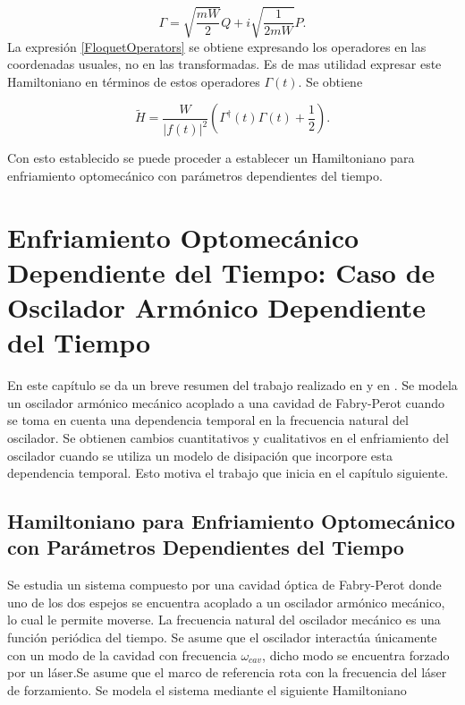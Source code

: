 \documentclass[10pt,a4paper]{report}
\begin{document}
\begin{equation}
\Gamma = \sqrt{\frac{mW}{2}}Q + i \sqrt{\frac{1}{2mW}}P.
\end{equation} La expresión \eqref{FloquetOperators} se obtiene expresando los operadores en las coordenadas usuales, no en las transformadas. Es de mas utilidad expresar este Hamiltoniano en términos de estos operadores $\Gamma(t)$. Se obtiene

\begin{equation}
\tilde{H} = \frac{W}{|f(t)|^2}(\Gamma^\dagger(t)\Gamma(t) + \frac{1}{2}).
\end{equation}

Con esto establecido se puede proceder a establecer un Hamiltoniano para enfriamiento optomecánico con parámetros dependientes del tiempo.



\chapter{Enfriamiento Optomecánico Dependiente del Tiempo: Caso de Oscilador Armónico Dependiente del Tiempo}

En este capítulo se da un breve resumen del trabajo realizado en \cite{TesisMaestria} y en \cite{YanesOC}. Se modela un oscilador armónico mecánico acoplado a una cavidad de Fabry-Perot cuando se toma en cuenta una dependencia temporal en la frecuencia natural del oscilador. Se obtienen cambios cuantitativos y cualitativos en el enfriamiento del oscilador cuando se utiliza un modelo de disipación que incorpore esta dependencia temporal. Esto motiva el trabajo que inicia en el capítulo siguiente.


\section{Hamiltoniano para Enfriamiento Optomecánico con Parámetros Dependientes del Tiempo}

Se estudia un sistema compuesto por una cavidad óptica de Fabry-Perot donde uno de los dos espejos se encuentra acoplado a un oscilador armónico mecánico, lo cual le permite moverse. La frecuencia natural del oscilador mecánico es una función periódica del tiempo. Se asume que el oscilador interactúa únicamente con un modo de la cavidad  con frecuencia $\omega_{cav}$, dicho modo se encuentra forzado por un láser.Se asume que el marco de referencia rota con la frecuencia del láser de forzamiento. Se modela el sistema mediante el siguiente Hamiltoniano\cite{BarberisLC}
\end{document}
